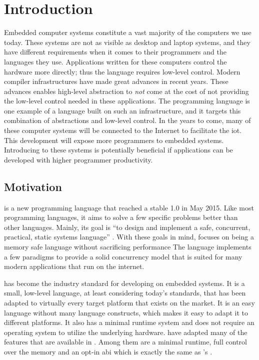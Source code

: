 
\chapter{Introduction}
\label{chap:intro}

Embedded computer systems constitute a vast majority of the computers we use today.
These systems are not as visible as desktop and laptop systems, and they have different requirements when it comes to their programmers and the languages they use.
Applications written for these computers control the hardware more directly; thus the language requires low-level control.
Modern compiler infrastructures have made great advances in recent years.
These advances enables high-level abstraction to \emph{not} come at the cost of not providing the low-level control needed in these applications.
The {\rust} programming language is one example of a language built on such an infrastructure, and it targets this combination of abstractions and low-level control.
In the years to come, many of these computer systems will be connected to the Internet to facilitate the \glsdesc{iot}.
This development will expose more programmers to embedded systems.
Introducing {\rust} to these systems is potentially beneficial if applications can be developed with higher programmer productivity.


\section{Motivation} %
\label{sec:intro:rust_as_replacement_to_c}

{\rust} is a new programming language that reached a stable 1.0 in May 2015.
Like most programming languages, it aims to solve a few specific problems better than other languages.
Mainly, its goal is ``to design and implement a safe, concurrent, practical, static systems language'' \cite{web:rust_faq}.
With these goals in mind, {\rust} focuses on being a memory safe language without sacrificing performance
The language implements a few paradigms to provide a solid concurrency model that is suited for many modern applications that run on the internet.

{\C} has become the industry standard for developing on embedded systems.
It is a small, low-level language, at least considering today's standards, that has been adapted to virtually every target platform that exists on the market.
It is an easy language without many language constructs, which makes it easy to adapt it to different platforms.
It also has a minimal runtime system and does not require an operating system to utilize the underlying hardware.
{\rust} have adapted many of the features that are available in {\C}.
Among them are a minimal runtime, full control over the memory and an opt-in \gls{abi} which is exactly the same as {\C}'s \cite{web:rust_once_run_everywhere}.

